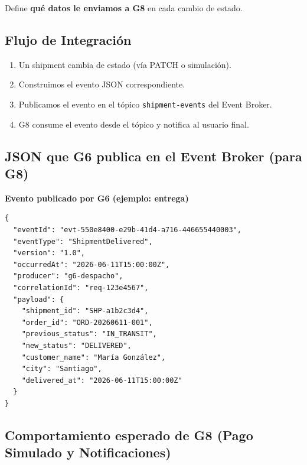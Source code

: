 \documentclass[11pt, a4paper]{article}
\newcommand{\contractheader}[1]{%
  \noindent\colorbox{primary!10}{%
    \parbox{\dimexpr\textwidth-2\fboxsep}{%
      \textbf{\faFileCode\quad #1}%
    }%
  }
  \vspace{0.3cm}
}
\begin{document}
Define \textbf{qué datos le enviamos a G8} en cada cambio de estado.

\subsection{Flujo de Integración}

\begin{enumerate}[noitemsep]
  \item Un shipment cambia de estado (vía PATCH o simulación).
  \item Construimos el evento JSON correspondiente.
  \item Publicamos el evento en el tópico \texttt{shipment-events} del Event Broker.
  \item G8 consume el evento desde el tópico y notifica al usuario final.
\end{enumerate}

\subsection{JSON que G6 publica en el Event Broker (para G8)}

\contractheader{Evento publicado por G6 (ejemplo: entrega)}

\begin{lstlisting}
{
  "eventId": "evt-550e8400-e29b-41d4-a716-446655440003",
  "eventType": "ShipmentDelivered",
  "version": "1.0",
  "occurredAt": "2026-06-11T15:00:00Z",
  "producer": "g6-despacho",
  "correlationId": "req-123e4567",
  "payload": {
    "shipment_id": "SHP-a1b2c3d4",
    "order_id": "ORD-20260611-001",
    "previous_status": "IN_TRANSIT",
    "new_status": "DELIVERED",
    "customer_name": "María González",
    "city": "Santiago",
    "delivered_at": "2026-06-11T15:00:00Z"
  }
}
\end{lstlisting}

\subsection{Comportamiento esperado de G8 (Pago Simulado y Notificaciones)}
\end{document}
